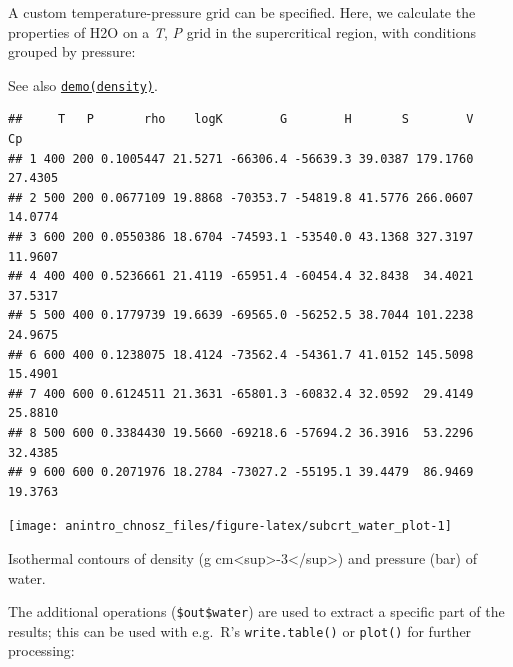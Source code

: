 \documentclass[]{tufte-book}
\newenvironment{Shaded}{}{}
\newcommand{\KeywordTok}[1]{\textcolor[rgb]{0.00,0.44,0.13}{\textbf{#1}}}
\newcommand{\DataTypeTok}[1]{\textcolor[rgb]{0.56,0.13,0.00}{#1}}
\newcommand{\DecValTok}[1]{\textcolor[rgb]{0.25,0.63,0.44}{#1}}
\newcommand{\StringTok}[1]{\textcolor[rgb]{0.25,0.44,0.63}{#1}}
\newcommand{\OperatorTok}[1]{\textcolor[rgb]{0.40,0.40,0.40}{#1}}
\newcommand{\NormalTok}[1]{#1}
\begin{document}
A custom temperature-pressure grid can be specified. Here, we calculate
the properties of H2O on a \emph{T}, \emph{P} grid in the supercritical
region, with conditions grouped by pressure:

\begin{marginfigure}
See also \href{../demo}{{\texttt{demo(density)}}}.
\end{marginfigure}

\begin{Shaded}
\end{Shaded}

\begin{verbatim}
##     T   P       rho    logK        G        H       S        V      Cp
## 1 400 200 0.1005447 21.5271 -66306.4 -56639.3 39.0387 179.1760 27.4305
## 2 500 200 0.0677109 19.8868 -70353.7 -54819.8 41.5776 266.0607 14.0774
## 3 600 200 0.0550386 18.6704 -74593.1 -53540.0 43.1368 327.3197 11.9607
## 4 400 400 0.5236661 21.4119 -65951.4 -60454.4 32.8438  34.4021 37.5317
## 5 500 400 0.1779739 19.6639 -69565.0 -56252.5 38.7044 101.2238 24.9675
## 6 600 400 0.1238075 18.4124 -73562.4 -54361.7 41.0152 145.5098 15.4901
## 7 400 600 0.6124511 21.3631 -65801.3 -60832.4 32.0592  29.4149 25.8810
## 8 500 600 0.3384430 19.5660 -69218.6 -57694.2 36.3916  53.2296 32.4385
## 9 600 600 0.2071976 18.2784 -73027.2 -55195.1 39.4479  86.9469 19.3763
\end{verbatim}

\begin{marginfigure}
\texttt{[image: anintro\_chnosz\_files/figure-latex/subcrt\_water\_plot-1]} \caption[Isothermal contours of density (g cm<sup>-3</sup>) and pressure (bar) of water]{Isothermal contours of density (g cm<sup>-3</sup>) and pressure (bar) of water.}\label{fig:subcrt_water_plot}
\end{marginfigure}

The additional operations (\texttt{\$out\$water}) are used to extract a
specific part of the results; this can be used with e.g.~R's
\texttt{write.table()} or \texttt{plot()} for further processing:
\end{document}
